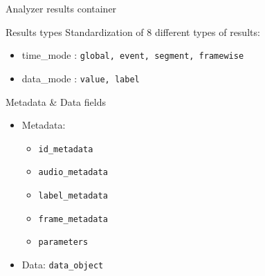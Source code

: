 \documentclass[10pt, final, hyperref, table]{beamer}
\begin{document}
\begin{frame}{Analyzer results container}
\begin{block}{Results types}
  Standardization of 8 different types of results:
  \begin{itemize}
  \item time\_mode : \texttt{global, event, segment, framewise}
  \item data\_mode : \texttt{value, label}
  \end{itemize}
\end{block}
\begin{block}{Metadata \& Data fields}
  \begin{itemize}
  \item Metadata:
    \begin{itemize}
    \item \texttt{id\_metadata}
    \item \texttt{audio\_metadata}
    \item \texttt{label\_metadata}
    \item \texttt{frame\_metadata}
    \item \texttt{parameters}
    \end{itemize}
    \item Data: \texttt{data\_object}
  \end{itemize}

\end{block}

\end{frame}
\end{document}
